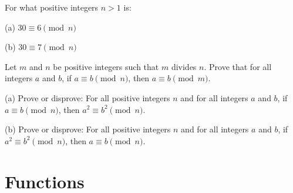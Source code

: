 \documentclass[11pt,paper=b5,footinclude,headinclude]{scrbook} %
\theoremstyle{remark}
\theoremstyle{definition} %
\theoremstyle{theorem} %
\newtheorem{ex}{Exercise\hypertarget{sol:\theex}}[chapter]
\begin{document}
\begin{ex}
For what positive integers \( n > 1 \) is:

(a) \( 30 \equiv 6 \pmod{n} \)

(b) \( 30 \equiv 7 \pmod{n} \)
\end{ex}

\begin{ex}
Let \( m \) and \( n \) be positive integers such that \( m \) divides \( n \). Prove that for all integers \( a \) and \( b \), if \( a \equiv b \pmod{n} \), then \( a \equiv b \pmod{m} \).
\end{ex}

\begin{ex}
(a) Prove or disprove: For all positive integers \( n \) and for all integers \( a \) and \( b \), if \( a \equiv b \pmod{n} \), then \( a^2 \equiv b^2 \pmod{n} \).

(b) Prove or disprove: For all positive integers \( n \) and for all integers \( a \) and \( b \), if \( a^2 \equiv b^2 \pmod{n} \), then \( a \equiv b \pmod{n} \).
\end{ex}


\section{Functions}
\end{document}
